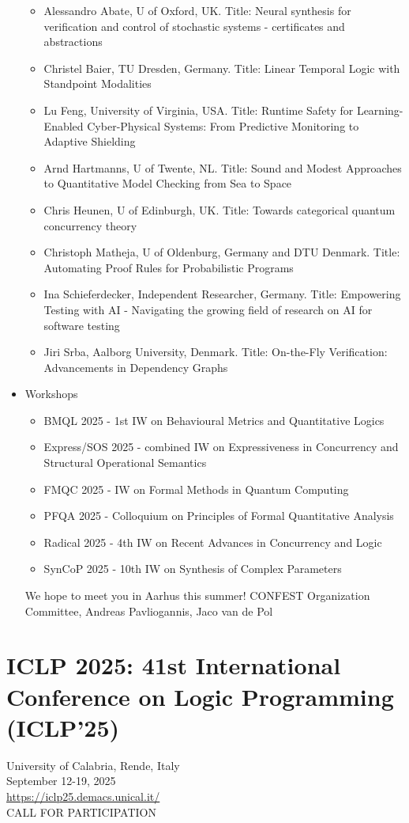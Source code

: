 \documentclass[prodmode,acmtecs]{acmsmall} %
\begin{document}
\begin{itemize}
\begin{itemize}\item  Alessandro Abate, U of Oxford, UK. Title: Neural synthesis for verification and control of stochastic systems - certificates and abstractions
\item  Christel Baier, TU Dresden, Germany. Title: Linear Temporal Logic with Standpoint Modalities
\item  Lu Feng, University of Virginia, USA. Title: Runtime Safety for Learning-Enabled Cyber-Physical Systems: From Predictive Monitoring to Adaptive Shielding
\item  Arnd Hartmanns, U of Twente, NL. Title: Sound and Modest Approaches to Quantitative Model Checking from Sea to Space
\item  Chris Heunen, U of Edinburgh, UK. Title: Towards categorical quantum concurrency theory
\item  Christoph Matheja, U of Oldenburg, Germany and DTU Denmark. Title: Automating Proof Rules for Probabilistic Programs
\item  Ina Schieferdecker, Independent Researcher, Germany. Title: Empowering Testing with AI - Navigating the growing field of research on AI for software testing
\item  Jiri Srba, Aalborg University, Denmark. Title: On-the-Fly Verification: Advancements in Dependency Graphs
\end{itemize} 
\item Workshops 
 
\begin{itemize}\item  BMQL 2025 - 1st IW on Behavioural Metrics and Quantitative Logics
\item  Express/SOS 2025 - combined IW on Expressiveness in Concurrency and Structural Operational Semantics
\item  FMQC 2025 - IW on Formal Methods in Quantum Computing
\item  PFQA 2025 - Colloquium on Principles of Formal Quantitative Analysis
\item  Radical 2025 -  4th IW on Recent Advances in Concurrency and Logic
\item  SynCoP 2025 - 10th IW on Synthesis of Complex Parameters
\end{itemize} 
  We hope to meet you in Aarhus this summer! CONFEST Organization Committee, Andreas Pavliogannis, Jaco van de Pol 
 
\end{itemize}\section{ICLP 2025: 41st International Conference on Logic Programming (ICLP’25) }\label{ICLP2025}  University of Calabria, Rende, Italy \\ 
  September 12-19, 2025\\ 
  \href{https://iclp25.demacs.unical.it/}{https://iclp25.demacs.unical.it/}\\ 
CALL FOR PARTICIPATION 
\end{document}
